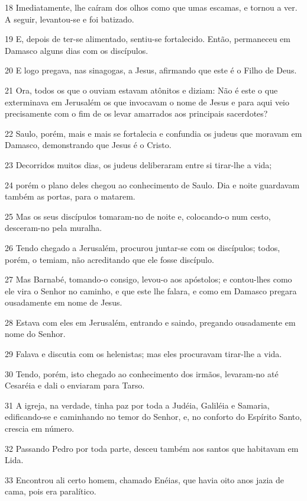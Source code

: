 \par 18 Imediatamente, lhe caíram dos olhos como que umas escamas, e tornou a ver. A seguir, levantou-se e foi batizado.
\par 19 E, depois de ter-se alimentado, sentiu-se fortalecido. Então, permaneceu em Damasco alguns dias com os discípulos.
\par 20 E logo pregava, nas sinagogas, a Jesus, afirmando que este é o Filho de Deus.
\par 21 Ora, todos os que o ouviam estavam atônitos e diziam: Não é este o que exterminava em Jerusalém os que invocavam o nome de Jesus e para aqui veio precisamente com o fim de os levar amarrados aos principais sacerdotes?
\par 22 Saulo, porém, mais e mais se fortalecia e confundia os judeus que moravam em Damasco, demonstrando que Jesus é o Cristo.
\par 23 Decorridos muitos dias, os judeus deliberaram entre si tirar-lhe a vida;
\par 24 porém o plano deles chegou ao conhecimento de Saulo. Dia e noite guardavam também as portas, para o matarem.
\par 25 Mas os seus discípulos tomaram-no de noite e, colocando-o num cesto, desceram-no pela muralha.
\par 26 Tendo chegado a Jerusalém, procurou juntar-se com os discípulos; todos, porém, o temiam, não acreditando que ele fosse discípulo.
\par 27 Mas Barnabé, tomando-o consigo, levou-o aos apóstolos; e contou-lhes como ele vira o Senhor no caminho, e que este lhe falara, e como em Damasco pregara ousadamente em nome de Jesus.
\par 28 Estava com eles em Jerusalém, entrando e saindo, pregando ousadamente em nome do Senhor.
\par 29 Falava e discutia com os helenistas; mas eles procuravam tirar-lhe a vida.
\par 30 Tendo, porém, isto chegado ao conhecimento dos irmãos, levaram-no até Cesaréia e dali o enviaram para Tarso.
\par 31 A igreja, na verdade, tinha paz por toda a Judéia, Galiléia e Samaria, edificando-se e caminhando no temor do Senhor, e, no conforto do Espírito Santo, crescia em número.
\par 32 Passando Pedro por toda parte, desceu também aos santos que habitavam em Lida.
\par 33 Encontrou ali certo homem, chamado Enéias, que havia oito anos jazia de cama, pois era paralítico.
